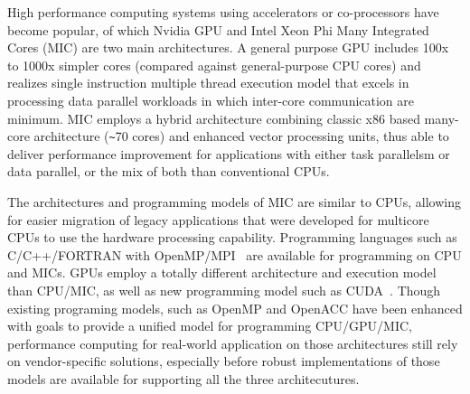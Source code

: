  High performance computing systems using accelerators or co-processors have become popular, of which Nvidia GPU and 
Intel Xeon Phi Many Integrated Cores (MIC) are two main architectures.  
A general purpose GPU includes 100x to 1000x simpler cores (compared against general-purpose CPU cores) 
and realizes single instruction multiple thread execution model 
that excels in processing data parallel workloads in which inter-core
communication are minimum. 
MIC employs a hybrid architecture combining classic x86 based many-core architecture (\verb#~#70 cores) 
and enhanced vector processing units, thus able to deliver performance improvement for applications with either task parallelsm or data parallel, or
the mix of both than conventional CPUs.  

The architectures and programming models of MIC are similar to CPUs,
allowing for easier migration of legacy applications that were developed for multicore CPUs
to use the hardware processing capability. Programming languages such as C/C++/FORTRAN with OpenMP/MPI~\cite{R:6,R:20} are available for programming
on CPU and MICs. 
GPUs employ a totally different architecture and execution model than CPU/MIC, as well as new programming model such as CUDA~\cite{R:21}. Though 
existing programing models, such as OpenMP and OpenACC have been enhanced with goals to provide 
a unified model for programming CPU/GPU/MIC, performance
computing for real-world application on those architectures still rely on vendor-specific solutions, especially before robust implementations of 
those models are available for supporting all the three architecutures. 

 
   


